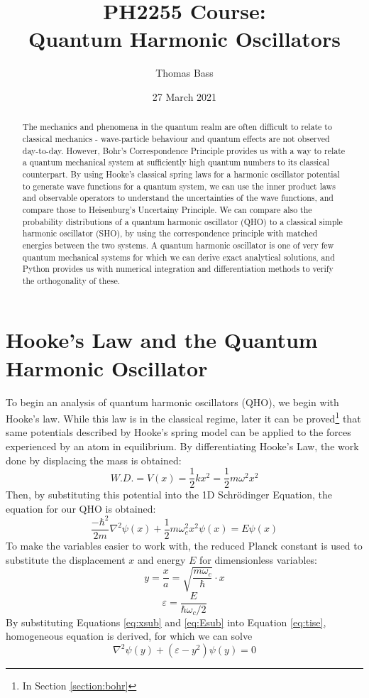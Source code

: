 \documentclass[a4paper]{article}
\title{PH2255 Course:\\
Quantum Harmonic Oscillators}
\author{Thomas Bass}
\date{27 March 2021}
\begin{document}
\maketitle

\begin{abstract}
The mechanics and phenomena in the quantum realm are often difficult to relate to classical mechanics - wave-particle behaviour and quantum effects are not observed day-to-day.
However, Bohr's Correspondence Principle provides us with a way to relate a quantum mechanical system at sufficiently high quantum numbers to its classical counterpart.
By using Hooke's classical spring laws for a harmonic oscillator potential to generate wave functions for a quantum system, we can use the inner product laws and observable operators to understand the uncertainties of the wave functions, and compare those to Heisenburg's Uncertainy Principle. 
We can compare also the probability distributions of a quantum harmonic oscillator (QHO) to a classical simple harmonic oscillator (SHO), by using the correspondence principle with matched energies between the two systems.
A quantum harmonic oscillator is one of very few quantum mechanical systems for which we can derive exact analytical solutions, and Python provides us with numerical integration and differentiation methods to verify the orthogonality of these. 
\end{abstract}

\section{Hooke's Law and the Quantum Harmonic Oscillator}
To begin an analysis of quantum harmonic oscillators (QHO), we begin with Hooke's law. While this law is in the classical regime, later it can be proved\footnote{In Section \ref{section:bohr}} that same potentials described by Hooke's spring model can be applied to the forces experienced by an atom in equilibrium. By differentiating Hooke's Law, the work done by displacing the mass is obtained:
\begin{equation} \label{eq:hooke}
W.D.=V(x)=\frac12kx^2=\frac12m\omega^2x^2
\end{equation}
Then, by substituting this potential into the 1D Schr\"odinger Equation, the equation for our QHO is obtained:
\begin{equation} \label{eq:tise}
\frac{-\hbar^2}{2m}\nabla^2\psi(x) + \frac12m\omega^2_cx^2\psi(x)=E\psi(x)
\end{equation}
To make the variables easier to work with, the reduced Planck constant is used to substitute the displacement $x$ and energy $E$ for dimensionless variables:
\begin{equation} \label{eq:xsub}
y=\frac xa=\sqrt{\frac{m\omega_c}\hbar}\cdot x
\end{equation}
\begin{equation} \label{eq:Esub}
\varepsilon=\frac E{\hbar\omega_c/2}
\end{equation}
By substituting Equations \ref{eq:xsub} and \ref{eq:Esub} into Equation \ref{eq:tise}, homogeneous equation is derived, for which we can solve
\begin{equation} \label{eq:tise_hom}
\nabla^2\psi(y)+(\varepsilon-y^2)\psi(y)=0
\end{equation} 
\end{document}
